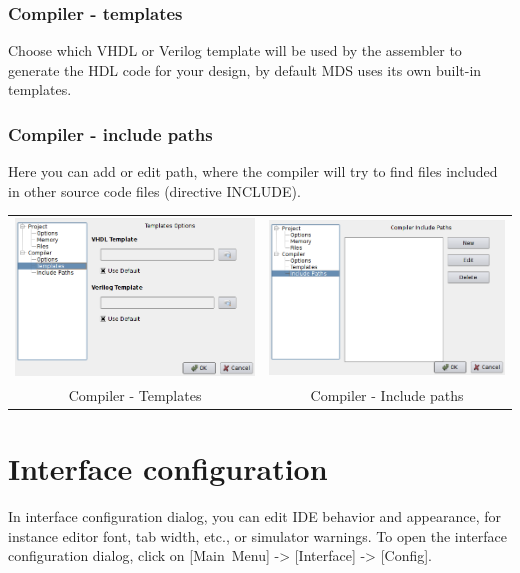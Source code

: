         \subsubsection{Compiler - templates}
            Choose which VHDL or Verilog template will be used by the assembler to generate the HDL code for your
            design, by default MDS uses its own built-in templates.

        \subsubsection{Compiler - include paths}
            Here you can add or edit path, where the compiler will try to find files included in other source code files
            (directive INCLUDE).

        \begin{table}[h!]
            \begin{tabular}{cc}
                \includegraphics[width=.5\textwidth]{img/config5.png}
                    &
                \includegraphics[width=.5\textwidth]{img/config6.png}
                    \\
                Compiler - Templates & Compiler - Include paths
            \end{tabular}
            \end{table}

\section{Interface configuration}
    In interface configuration dialog, you can edit IDE behavior and appearance, for instance editor font, tab width,
    etc., or simulator warnings. To open the interface configuration dialog, click on [Main~Menu] -> [Interface] ->
    [Config].

